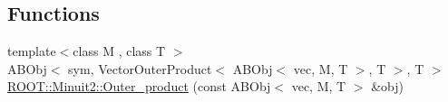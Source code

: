 \subsection*{Functions}
\begin{DoxyCompactItemize}
\item 
{\footnotesize template$<$class M , class T $>$ }\\A\+B\+Obj$<$ sym, Vector\+Outer\+Product$<$ A\+B\+Obj$<$ vec, M, T $>$, T $>$, T $>$ \mbox{\hyperlink{namespaceROOT_1_1Minuit2_af2403945113672e7581188addb96ff15}{R\+O\+O\+T\+::\+Minuit2\+::\+Outer\+\_\+product}} (const A\+B\+Obj$<$ vec, M, T $>$ \&obj)
\end{DoxyCompactItemize}

